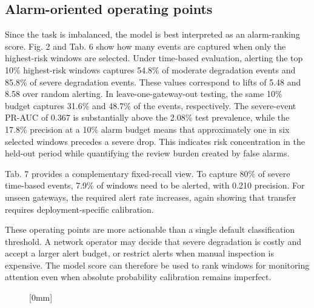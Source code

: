 \documentclass{jot}
\begin{document}
\subsection{Alarm-oriented operating points}\label{s:4.4}
Since the task is imbalanced, the model is best interpreted as an alarm-ranking score. Fig. 2 and Tab. 6 show how many events are captured when only the highest-risk windows are selected. Under time-based evaluation, alerting the top 10\% highest-risk windows captures 54.8\% of moderate degradation events and 85.8\% of severe degradation events. These values correspond to lifts of 5.48 and 8.58 over random alerting. In leave-one-gateway-out testing, the same 10\% budget captures 31.6\% and 48.7\% of the events, respectively. The severe-event PR-AUC of 0.367 is substantially above the 2.08\% test prevalence, while the 17.8\% precision at a 10\% alarm budget means that approximately one in six selected windows precedes a severe drop. This indicates risk concentration in the held-out period while quantifying the review burden created by false alarms.

Tab. 7 provides a complementary fixed-recall view. To capture 80\% of severe time-based events, 7.9\% of windows need to be alerted, with 0.210 precision. For unseen gateways, the required alert rate increases, again showing that transfer requires deployment-specific calibration.

These operating points are more actionable than a single default classification threshold. A network operator may decide that severe degradation is costly and accept a larger alert budget, or restrict alerts when manual inspection is expensive. The model score can therefore be used to rank windows for monitoring attention even when absolute probability calibration remains imperfect.

\begin{figure}[t]
[0mm]
\end{figure}
\end{document}
